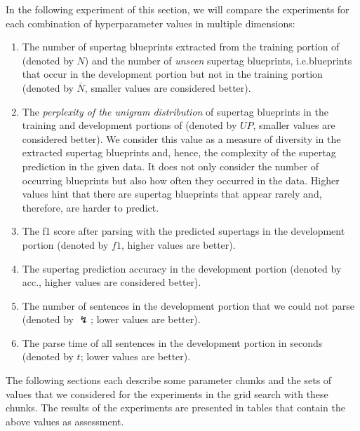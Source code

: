 \documentclass[../../document.tex]{subfiles}
\begin{document}
    In the following experiment of this section, we will compare the experiments for each combination of hyperparameter values in multiple dimensions:
    \begin{enumerate}
        \item The number of supertag blueprints extracted from the training portion of \negra{} (denoted by \(N\)) and the number of \emph{unseen} supertag blueprints, i.e.\@ blueprints that occur in the development portion but not in the training portion (denoted by \(\overline{N}\), smaller values are considered better).
        \item The \emph{perplexity of the unigram distribution} of supertag blueprints in the training and development portions of \negra{} (denoted by \(\mathit{UP}\), smaller values are considered better). We consider this value as a measure of diversity in the extracted supertag blueprints and, hence, the complexity of the supertag prediction in the given data. It does not only consider the number of occurring blueprints but also how often they occurred in the data. Higher values hint that there are supertag blueprints that appear rarely and, therefore, are harder to predict.
        \item The f1 score after parsing with the predicted supertags in the development portion (denoted by \(f1\), higher values are better).
        \item The supertag prediction accuracy in the development portion (denoted by acc., higher values are considered better).
        \item The number of sentences in the development portion that we could not parse (denoted by $\lightning$; lower values are better).
        \item The parse time of all sentences in the development portion in seconds (denoted by \(t\); lower values are better).
    \end{enumerate}

    The following sections each describe some parameter chunks and the sets of values that we considered for the experiments in the grid search with these chunks.
    The results of the experiments are presented in tables that contain the above values as assessment.
\end{document}
